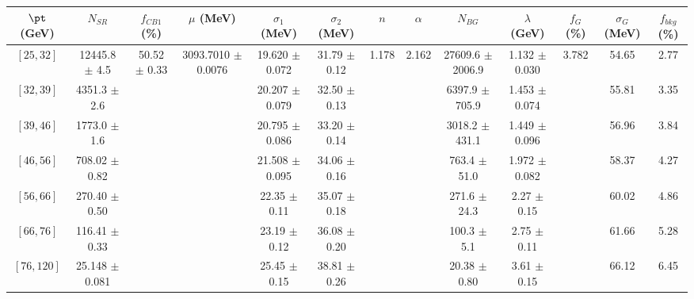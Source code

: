 \begin{tabular}{c||c|c|c|c|c|c|c|c|c|c|c||c}
$\pt$ (GeV) & $N_{SR}$ & $f_{CB1}$ (\%) & $\mu$ (MeV) & $\sigma_1$ (MeV) & $\sigma_2$ (MeV) & $n$ & $\alpha$ & $N_{BG}$ & $\lambda$ (GeV) & $f_G$ (\%) & $\sigma_G$ (MeV) & $f_{bkg}$ (\%) \\
\hline
$[25, 32]$ & 12445.8 $\pm$ 4.5 & \multirow{7}{*}{50.52 $\pm$ 0.33} & \multirow{7}{*}{3093.7010 $\pm$ 0.0076} & 19.620 $\pm$ 0.072 & 31.79 $\pm$ 0.12 & \multirow{7}{*}{1.178} & \multirow{7}{*}{2.162} & 27609.6 $\pm$ 2006.9 & 1.132 $\pm$ 0.030 & \multirow{7}{*}{3.782} & 54.65 & 2.77\\
$[32, 39]$ & 4351.3 $\pm$ 2.6 &  &  & 20.207 $\pm$ 0.079 & 32.50 $\pm$ 0.13 &  &  & 6397.9 $\pm$ 705.9 & 1.453 $\pm$ 0.074 &  & 55.81 & 3.35\\
$[39, 46]$ & 1773.0 $\pm$ 1.6 &  &  & 20.795 $\pm$ 0.086 & 33.20 $\pm$ 0.14 &  &  & 3018.2 $\pm$ 431.1 & 1.449 $\pm$ 0.096 &  & 56.96 & 3.84\\
$[46, 56]$ & 708.02 $\pm$ 0.82 &  &  & 21.508 $\pm$ 0.095 & 34.06 $\pm$ 0.16 &  &  & 763.4 $\pm$ 51.0 & 1.972 $\pm$ 0.082 &  & 58.37 & 4.27\\
$[56, 66]$ & 270.40 $\pm$ 0.50 &  &  & 22.35 $\pm$ 0.11 & 35.07 $\pm$ 0.18 &  &  & 271.6 $\pm$ 24.3 & 2.27 $\pm$ 0.15 &  & 60.02 & 4.86\\
$[66, 76]$ & 116.41 $\pm$ 0.33 &  &  & 23.19 $\pm$ 0.12 & 36.08 $\pm$ 0.20 &  &  & 100.3 $\pm$ 5.1 & 2.75 $\pm$ 0.11 &  & 61.66 & 5.28\\
$[76, 120]$ & 25.148 $\pm$ 0.081 &  &  & 25.45 $\pm$ 0.15 & 38.81 $\pm$ 0.26 &  &  & 20.38 $\pm$ 0.80 & 3.61 $\pm$ 0.15 &  & 66.12 & 6.45\\
\end{tabular}
